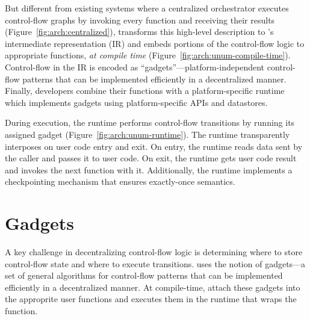 But different from existing systems where a centralized orchestrator executes
control-flow graphs by invoking every function and receiving their results
(Figure~\ref{fig:arch:centralized}), \name{} transforms this high-level
description to \name{}'s intermediate representation (IR) and embeds portions
of the control-flow logic to appropriate functions, \emph{at compile time}
(Figure~\ref{fig:arch:unum-compile-time}). Control-flow in the IR is encoded
as ``gadgets''---platform-independent control-flow patterns that can be
implemented efficiently in a decentralized manner. Finally, developers combine
their functions with a platform-specific \name{} runtime which implements
gadgets using platform-specific APIs and datastores.

During execution, the \name{} runtime performs control-flow transitions by
running its assigned gadget (Figure~\ref{fig:arch:unum-runtime}). The runtime
transparently interposes on user code entry and exit. On entry, the runtime
reads data sent by the caller and passes it to user code. On exit, the runtime
gets user code result and invokes the next function with it. Additionally, the
runtime implements a checkpointing mechanism that ensures exactly-once
semantics.






\section{Gadgets}\label{sec:gadgets}

A key challenge in decentralizing control-flow logic is determining where to
store control-flow state and where to execute transitions. \name{} uses the
notion of gadgets---a set of general algorithms for control-flow patterns that
can be implemented efficiently in a decentralized manner. At compile-time,
\name{} attach these gadgets into the approprite user functions and executes
them in the \name{} runtime that wraps the function.

